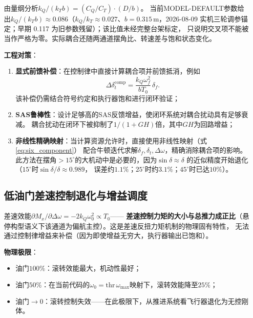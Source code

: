 由量纲分析$k_Q / (k_T b) = (C_Q / C_T) \cdot (D / b)$。
当前MODEL-DEFAULT参数给出$k_Q/(k_Tb)\approx 0.086$（$k_Q/k_T\approx0.027$、$b=0.315$\,m，2026-08-09 实机三轮调参锚定；早期 0.117 为旧参数残留）；该比值未经完整台架标定，
只说明交叉项不能被当作严格为零。实际耦合还随两通道摆角比、转速差与饱和状态变化。

\textbf{工程对策}：
\begin{enumerate}[label=(\arabic*)]
    \item \textbf{显式前馈补偿}：在控制律中直接计算耦合项并前馈抵消，例如
          \begin{equation*}
              \Delta \delta_t^{\text{comp}}
              = \frac{k_Q \omega_f^2}{b T_0}\,\delta_f .
          \end{equation*}
          该补偿仍需结合符号约定和执行器饱和进行闭环验证；
    \item \textbf{SAS鲁棒性}：设计足够高的SAS反馈增益，使闭环系统对耦合扰动具有足够衰减。
          耦合扰动在闭环下被抑制了$1/(1+GH)$倍，其中$GH$为回路增益；
    \item \textbf{非线性精确映射}：当计算资源允许时，直接使用非线性映射（式\ref{eq:six_component}）
          配合牛顿迭代求解$\delta_f, \delta_t, \Delta\omega$，精确消除耦合项的影响。
          此方法在摆角$>15^\circ$的大机动中是必要的，因为$\sin\delta \approx \delta$
          的近似精度开始退化（$15^\circ$时$\sin\delta/\delta \approx 0.989$，
          误差约$1.1\%$；$25^\circ$时约$3.1\%$；$45^\circ$时已达$10\%$）。
\end{enumerate}

\subsection{低油门差速控制退化与增益调度}

差速效能$\partial M_x / \partial \Delta\omega = -2 k_Q \omega_0^2 \propto T_0$——
\textbf{差速控制力矩的大小与总推力成正比}（悬停构型语义下该通道为偏航主控）。这是差速反扭力矩机制的物理固有特性，
无法通过控制律增益来补偿（因为即使增益无穷大，执行器输出已饱和）。

\textbf{物理极限}：
\begin{itemize}
    \item 油门$100\%$：滚转效能最大，机动性最好；
    \item 油门$50\%$：在当前代码的$\omega_0=\text{thr}\,\omega_{\max}$映射下，滚转效能降至$25\%$；
    \item 油门$\to 0$：滚转控制失效——在此极限下，从推进系统看飞行器退化为无控刚体。
\end{itemize}

